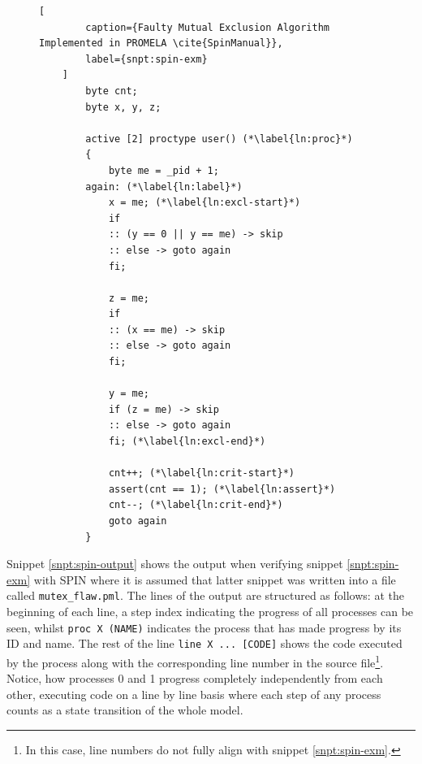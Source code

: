 \begin{figure}
    \begin{lstlisting}[
        caption={Faulty Mutual Exclusion Algorithm Implemented in PROMELA \cite{SpinManual}},
        label={snpt:spin-exm}
    ]
        byte cnt;
        byte x, y, z;

        active [2] proctype user() (*\label{ln:proc}*)
        {
            byte me = _pid + 1;
        again: (*\label{ln:label}*)
            x = me; (*\label{ln:excl-start}*)
            if
            :: (y == 0 || y == me) -> skip
            :: else -> goto again
            fi;

            z = me;
            if
            :: (x == me) -> skip
            :: else -> goto again
            fi;

            y = me;
            if (z = me) -> skip
            :: else -> goto again
            fi; (*\label{ln:excl-end}*)

            cnt++; (*\label{ln:crit-start}*)
            assert(cnt == 1); (*\label{ln:assert}*)
            cnt--; (*\label{ln:crit-end}*)
            goto again
        }
    \end{lstlisting}
\end{figure}

Snippet \ref{snpt:spin-output} shows the output when verifying snippet \ref{snpt:spin-exm} with SPIN where it is assumed that latter snippet was written into a file called \lstinline{mutex_flaw.pml}.
The lines of the output are structured as follows: at the beginning of each line, a step index indicating the progress of all processes can be seen, whilst \lstinline{proc X (NAME)} indicates the process that has made progress by its ID and name.
The rest of the line \lstinline{line X ... [CODE]} shows the code executed by the process along with the corresponding line number in the source file\footnote{%
    In this case, line numbers do not fully align with snippet \ref{snpt:spin-exm}.
}.
Notice, how processes 0 and 1 progress completely independently from each other, executing code on a line by line basis where each step of any process counts as a state transition of the whole model.

